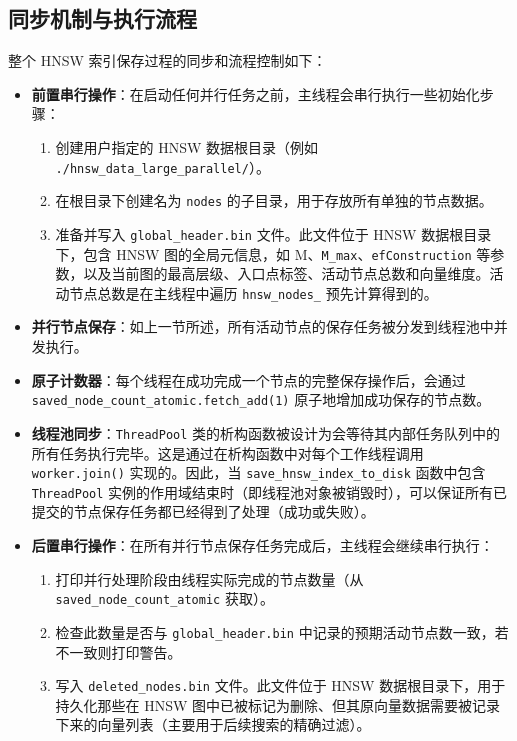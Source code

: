 \documentclass{ctexart} %
\begin{document}
\subsection{同步机制与执行流程}
整个 HNSW 索引保存过程的同步和流程控制如下：
\begin{itemize}
    \item \textbf{前置串行操作}：在启动任何并行任务之前，主线程会串行执行一些初始化步骤：
    \begin{enumerate}
        \item 创建用户指定的 HNSW 数据根目录（例如 \texttt{./hnsw_data_large_parallel/}）。
        \item 在根目录下创建名为 \texttt{nodes} 的子目录，用于存放所有单独的节点数据。
        \item 准备并写入 \texttt{global_header.bin} 文件。此文件位于 HNSW 数据根目录下，包含 HNSW 图的全局元信息，如 M、\texttt{M_max}、\texttt{efConstruction} 等参数，以及当前图的最高层级、入口点标签、活动节点总数和向量维度。活动节点总数是在主线程中遍历 \texttt{hnsw_nodes_} 预先计算得到的。
    \end{enumerate}
    \item \textbf{并行节点保存}：如上一节所述，所有活动节点的保存任务被分发到线程池中并发执行。
    \item \textbf{原子计数器}：每个线程在成功完成一个节点的完整保存操作后，会通过 \texttt{saved_node_count_atomic.fetch_add(1)} 原子地增加成功保存的节点数。
    \item \textbf{线程池同步}：\texttt{ThreadPool} 类的析构函数被设计为会等待其内部任务队列中的所有任务执行完毕。这是通过在析构函数中对每个工作线程调用 \texttt{worker.join()} 实现的。因此，当 \texttt{save_hnsw_index_to_disk} 函数中包含 \texttt{ThreadPool} 实例的作用域结束时（即线程池对象被销毁时），可以保证所有已提交的节点保存任务都已经得到了处理（成功或失败）。
    \item \textbf{后置串行操作}：在所有并行节点保存任务完成后，主线程会继续串行执行：
    \begin{enumerate}
        \item 打印并行处理阶段由线程实际完成的节点数量（从 \texttt{saved_node_count_atomic} 获取）。
        \item 检查此数量是否与 \texttt{global_header.bin} 中记录的预期活动节点数一致，若不一致则打印警告。
        \item 写入 \texttt{deleted_nodes.bin} 文件。此文件位于 HNSW 数据根目录下，用于持久化那些在 HNSW 图中已被标记为删除、但其原向量数据需要被记录下来的向量列表（主要用于后续搜索的精确过滤）。
    \end{enumerate}
\end{itemize}
\end{document}
